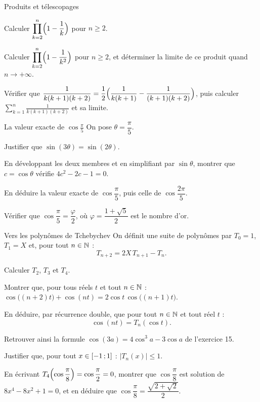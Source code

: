 \begin{exercice}[3]{Produits et télescopages}
\begin{questions}
  \item Calculer $\displaystyle\prod_{k=2}^{n}\Bigl(1-\frac{1}{k}\Bigr)$ pour $n\geq2$.
  \item Calculer $\displaystyle\prod_{k=2}^{n}\Bigl(1-\frac{1}{k^{2}}\Bigr)$ pour $n\geq2$,
    et déterminer la limite de ce produit quand $n\to+\infty$.
  \item Vérifier que $\dfrac{1}{k(k+1)(k+2)}=\dfrac12\Bigl(\dfrac{1}{k(k+1)}-\dfrac{1}{(k+1)(k+2)}\Bigr)$,
    puis calculer $\displaystyle\sum_{k=1}^{n}\frac{1}{k(k+1)(k+2)}$ et sa limite.
\end{questions}
\end{exercice}

\begin{exercice}[3]{La valeur exacte de $\cos\frac{\pi}{5}$}
On pose $\theta=\dfrac{\pi}{5}$.
\begin{questions}
  \item Justifier que $\sin(3\theta)=\sin(2\theta)$.
  \item En développant les deux membres et en simplifiant par $\sin\theta$,
    montrer que $c=\cos\theta$ vérifie $4c^{2}-2c-1=0$.
  \item En déduire la valeur exacte de $\cos\dfrac{\pi}{5}$, puis celle de
    $\cos\dfrac{2\pi}{5}$.
  \item Vérifier que $\cos\dfrac{\pi}{5}=\dfrac{\varphi}{2}$, où
    $\varphi=\dfrac{1+\sqrt5}{2}$ est le nombre d'or.
\end{questions}
\end{exercice}

\begin{exercice}[3]{Vers les polynômes de Tchebychev}
On définit une suite de polynômes par $T_0=1$, $T_1=X$ et, pour tout $n\in\mathbb{N}$ :
\[
  T_{n+2}=2X\,T_{n+1}-T_n.
\]
\begin{questions}
  \item Calculer $T_2$, $T_3$ et $T_4$.
  \item Montrer que, pour tous réels $t$ et tout $n\in\mathbb{N}$ :
    $\cos\bigl((n+2)t\bigr)+\cos(nt)=2\cos t\,\cos\bigl((n+1)t\bigr)$.
  \item En déduire, par récurrence double, que pour tout $n\in\mathbb{N}$ et tout réel $t$ :
    \[
      \cos(nt)=T_n(\cos t).
    \]
  \item Retrouver ainsi la formule $\cos(3a)=4\cos^{3}a-3\cos a$ de l'exercice 15.
\end{questions}
\begin{questions}[resume]
  \item Justifier que, pour tout $x\in\mathopen{[}-1\,{;}\,1\mathclose{]}$ : $|T_n(x)|\leq1$.
  \item En écrivant $T_4\Bigl(\cos\dfrac{\pi}{8}\Bigr)=\cos\dfrac{\pi}{2}=0$,
    montrer que $\cos\dfrac{\pi}{8}$ est solution de $8x^{4}-8x^{2}+1=0$, et en
    déduire que $\cos\dfrac{\pi}{8}=\dfrac{\sqrt{2+\sqrt2}}{2}$.
\end{questions}
\end{exercice}


